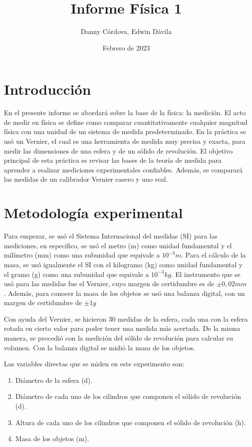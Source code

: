 \documentclass[a4paper]{article}
\title{Informe Física 1}
\author{Danny Córdova, Edwin Dávila}
\date{Febrero de 2023}
\begin{document}
\maketitle

\section{Introducción}
En el presente informe se abordará sobre la base de la física: la medición. El acto de medir en física se define como comparar cuantitativamente cualquier magnitud física con una unidad de un sistema de medida predeterminado. En la práctica se usó un Vernier, el cual es una herramienta de medida muy precisa y exacta, para medir las dimensiones de una esfera y de un sólido de revolución. El objetivo principal de esta práctica es revisar las bases de la teoría de medida para aprender a realizar mediciones experimentales confiables. Además, se comparará las medidas de un calibrador Vernier casero y uno real.

\section{Metodología experimental}
Para empezar, se usó el Sistema Internacional del medidas (SI) para las mediciones, en específico, se usó el metro (m) como unidad fundamental y el milímetro (mm) como una subunidad que equivale a $10^{-3}m$. Para el cálculo de la masa, se usó igualmente el SI con el kilogramo (kg) como unidad fundamental y el gramo (g) como una subunidad que equivale a $10^{-3}kg$.  El instrumento que se usó para las medidas fue el Vernier, cuyo margen de certidumbre es de $\pm0,02 mm$. Además, para conocer la masa de los objetos se usó una balanza digital, con un margen de certidumbre de $\pm1 g$

Con ayuda del Vernier, se hicieron 30 medidas de la esfera, cada una con la esfera rotada en cierto valor para poder tener una medida más acertada. De la misma manera, se procedió con la medición del sólido de revolución para calcular su volumen. Con la balanza digital se midió la masa de los objetos. 

Las variables directas que se miden en este experimento son:
\begin{enumerate}
  \item Diámetro de la esfera (d).
  \item Diámetro de cada uno de los cilindros que componen el sólido de revolución (d).
  \item Altura de cada uno de los cilindros que componen el sólido de revolución (h).
  \item Masa de los objetos (m).
\end{enumerate}
\end{document}
